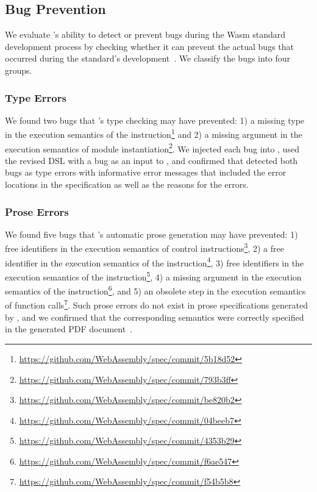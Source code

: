 \subsection{Bug Prevention}\label{sec:bug}
We evaluate \dslname's ability to detect or prevent bugs
during the Wasm standard development process
by checking whether it can prevent
the actual bugs that occurred during the standard's development~\cite{wasmspecrepo}.
We classify the bugs into four groups.

\subsubsection*{Type Errors}
We found two bugs that \dslname's type checking may have prevented:
1) a missing type in the execution semantics of the 
instruction\footnote{\url{https://github.com/WebAssembly/spec/commit/5b18d52}} and
2) a missing argument in the execution semantics of module
instantiation\footnote{\url{https://github.com/WebAssembly/spec/commit/793b3ff}}.
We injected each bug into \specdsl, used the revised DSL with a bug as an input to \dslname,
and confirmed that \dslname detected both bugs as type errors with 
informative error messages that included the error locations in the specification
as well as the reasons for the errors.

\subsubsection*{Prose Errors}
We found five bugs that \dslname's automatic prose generation may have prevented:
1) free identifiers in the execution semantics of control
instructions\footnote{\url{https://github.com/WebAssembly/spec/commit/be820b2}},
2) a free identifier in the execution semantics of the  
instruction\footnote{\url{https://github.com/WebAssembly/spec/commit/04beeb7}},
3) free identifiers in the execution semantics of the  
instruction\footnote{\url{https://github.com/WebAssembly/spec/commit/4353b29}},
4) a missing argument in the execution semantics of the  
instruction\footnote{\url{https://github.com/WebAssembly/spec/commit/f6ae547}}, and
5) an obsolete step in the execution semantics of function
calls\footnote{\url{https://github.com/WebAssembly/spec/commit/f54b5b8}}.
Such prose errors do not exist in prose specifications
generated by \dslname, and we confirmed that the corresponding semantics
were correctly specified in the generated PDF document~\cite{specdsl}.

